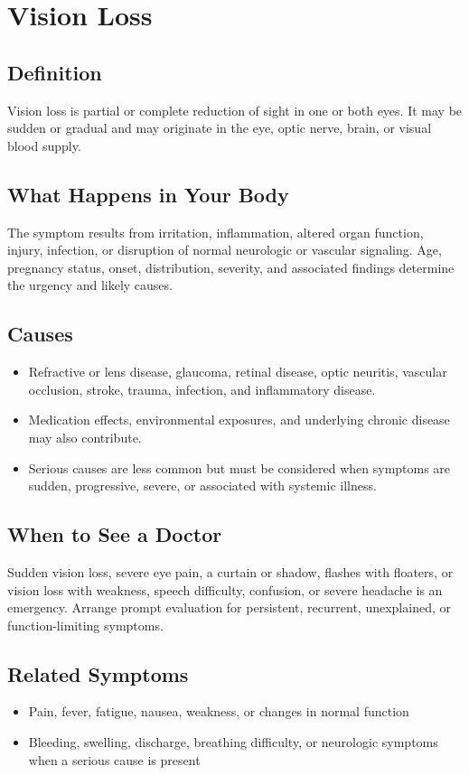 \chapter{Vision Loss}

\section*{Definition}
Vision loss is partial or complete reduction of sight in one or both eyes. It may be sudden or gradual and may originate in the eye, optic nerve, brain, or visual blood supply.

\section*{What Happens in Your Body}
The symptom results from irritation, inflammation, altered organ function, injury, infection, or disruption of normal neurologic or vascular signaling. Age, pregnancy status, onset, distribution, severity, and associated findings determine the urgency and likely causes.

\section*{Causes}
\begin{itemize}
  \item Refractive or lens disease, glaucoma, retinal disease, optic neuritis, vascular occlusion, stroke, trauma, infection, and inflammatory disease.
  \item Medication effects, environmental exposures, and underlying chronic disease may also contribute.
  \item Serious causes are less common but must be considered when symptoms are sudden, progressive, severe, or associated with systemic illness.
\end{itemize}

\section*{When to See a Doctor}
Sudden vision loss, severe eye pain, a curtain or shadow, flashes with floaters, or vision loss with weakness, speech difficulty, confusion, or severe headache is an emergency. Arrange prompt evaluation for persistent, recurrent, unexplained, or function-limiting symptoms.

\section*{Related Symptoms}
\begin{itemize}
  \item Pain, fever, fatigue, nausea, weakness, or changes in normal function
  \item Bleeding, swelling, discharge, breathing difficulty, or neurologic symptoms when a serious cause is present
\end{itemize}

